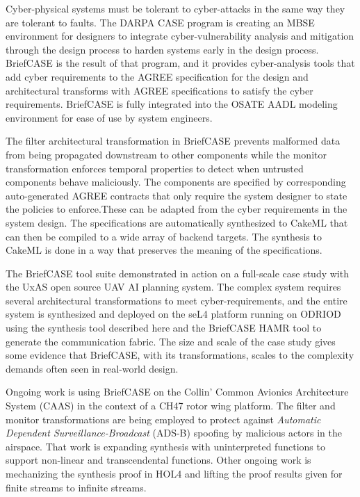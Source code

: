 Cyber-physical systems must be tolerant to cyber-attacks in the same way they are tolerant to faults. The DARPA CASE program is creating an MBSE environment for designers to integrate cyber-vulnerability analysis and mitigation through the design process to harden systems early in the design process. BriefCASE is the result of that program, and it provides cyber-analysis tools that add cyber requirements to the AGREE specification for the design and architectural transforms with AGREE specifications to satisfy the cyber requirements. BriefCASE is fully integrated into the OSATE AADL modeling environment for ease of use by system engineers.

The filter architectural transformation in BriefCASE prevents malformed data from being propagated downstream to other components while the monitor transformation enforces temporal properties to detect when untrusted components behave maliciously. The components are specified by corresponding auto-generated AGREE contracts that only require the system designer to state the policies to enforce.These can be adapted from the cyber requirements in the system design. The specifications are automatically synthesized to CakeML that can then be compiled to a wide array of backend targets. The synthesis to CakeML is done in a way that preserves the meaning of the specifications.

The BriefCASE tool suite demonstrated in action on a full-scale case study with the UxAS open source UAV AI planning system. The complex system requires several architectural transformations to meet cyber-requirements, and the entire system is synthesized and deployed on the seL4 platform running on ODRIOD using the synthesis tool described here and the BriefCASE HAMR tool to generate the communication fabric. The size and scale of the case study gives some evidence that BriefCASE, with its transformations, scales to the complexity demands often seen in real-world design.

Ongoing work is using BriefCASE on the Collin' Common Avionics Architecture System (CAAS) in the context of a CH47 rotor wing platform. The filter and monitor transformations are being employed to protect against \emph{Automatic Dependent Surveillance-Broadcast} (ADS-B) spoofing by malicious actors in the airspace. That work is expanding synthesis with uninterpreted functions to support non-linear and transcendental functions. Other ongoing work is mechanizing the synthesis proof in HOL4 and lifting the proof results given for finite streams to infinite streams.
